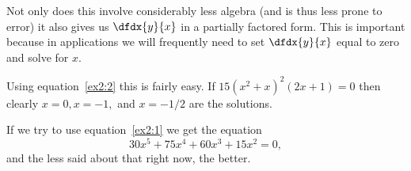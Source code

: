 \begin{myexample}{}
Not only does this involve considerably less algebra (and is thus less
prone to error) it also gives us $\dfdx{y}{x}$ in a partially factored
form. This is important because in applications we will frequently
need to set $\dfdx{y}{x}$ equal to zero and solve for $x.$

Using equation~\ref{ex2:2} this is fairly easy. If \(
15(x^2+x)^2(2x+1) = 0 \) then clearly $x=0, x=-1, $ and $x=-1/2$ are
the solutions.

If we try to use equation~\ref{ex2:1} we get the equation
\[ 30x^5+75x^4+60x^3+15 x^2 =0,\] and the less said about that right
now, the better.
\end{myexample}

